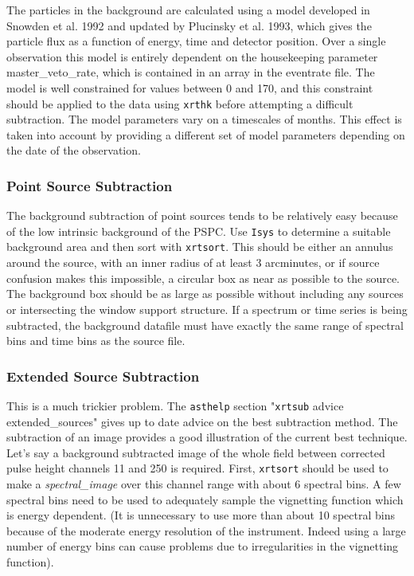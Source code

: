 \documentclass[11pt,fleqn]{article}    %
\begin{document}
The particles in  the background are calculated using  a model developed in
Snowden et al. 1992  and updated by Plucinsky  et al. 1993, which gives the
particle flux as a function  of energy, time  and detector position. Over a
single  observation this model  is entirely  dependent  on the housekeeping
parameter   master\_veto\_rate,  which is  contained  in an    array in the
eventrate file. The model is well constrained for values between 0 and 170,
and this constraint should be applied to the data  using {\tt xrthk} before
attempting  a   difficult subtraction.   The model   parameters  vary  on a
timescales of months.   This effect is   taken into account  by providing a
different set of model parameters depending on the date of the observation.

\subsubsection{Point Source Subtraction}
The background subtraction of point sources tends to be relatively easy
because of the low intrinsic background of the PSPC.  Use {\tt Isys}
to determine a suitable background area and then sort with {\tt xrtsort}.
This should be either an annulus around the source, with an inner radius of
at least 3 arcminutes, or if source confusion makes this impossible, a
circular box as near as possible to the source. The background box should
be as large as possible without including any sources or intersecting the
window support structure.  If a spectrum or time series is being
subtracted, the background datafile must have exactly the same range of
spectral bins and time bins as the source file.

\subsubsection{Extended Source Subtraction}
This is a much trickier problem. The {\tt asthelp} section 
"{\tt xrtsub} advice extended\_sources" gives up to date advice on the best 
subtraction method. The subtraction of an image provides a good illustration 
of the current best technique. Let's say a background subtracted image of 
the whole field between corrected pulse height channels 11 and 250 is
required. First, {\tt xrtsort} should be used to make a {\em spectral\_image}
over this channel range with about 6 spectral bins. A few spectral bins
need to be used to adequately sample the vignetting function which is energy
dependent.
(It is unnecessary to use more than about 10 spectral bins because of the
moderate energy resolution of the instrument. Indeed using a large number
of energy bins can cause problems due to irregularities in the vignetting
function). 
\end{document}
